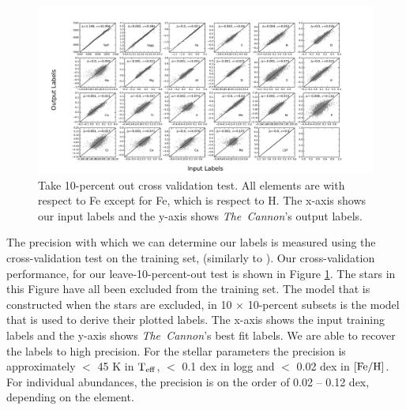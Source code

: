 \documentclass[14pt, preprint2]{aastex6}
\newcommand{\project}[1]{\textsl{#1}}
\newcommand{\tc}{\project{The~Cannon}}
\newcommand{\teff}{\mbox{$\rm T_{eff}$}}
\newcommand{\feh}{\mbox{$\rm [Fe/H]$}}
\begin{document}

\begin{figure}[h!]
\includegraphics[scale=0.45]{crossval_5026.pdf} 
  \caption{Take 10-percent out cross validation test. All elements are with respect to Fe except for Fe, which is respect to H. The x-axis shows our input labels and the y-axis shows \tc's output labels. }
\label{fig:cross}
\end{figure}

The precision with which we can determine our labels is measured using the cross-validation test on the training set, (similarly to \citet{Ness2015, Ho2016, Casey2016}). Our cross-validation performance, for our leave-10-percent-out test is shown in Figure \ref{fig:cross}. The stars in this Figure have all been excluded from the training set. The model that is constructed when the stars are excluded, in 10 $\times$ 10-percent subsets is the model that is used to derive their plotted labels. The x-axis shows the input training labels and the y-axis shows \tc's best fit labels. We are able to recover the labels to high precision. For the stellar parameters the precision is approximately $<$ 45 K in \teff, $<$ 0.1 dex in logg and $<$ 0.02 dex in \feh. For individual abundances, the precision is on the order of 0.02 -- 0.12 dex, depending on the element. 
\end{document}
